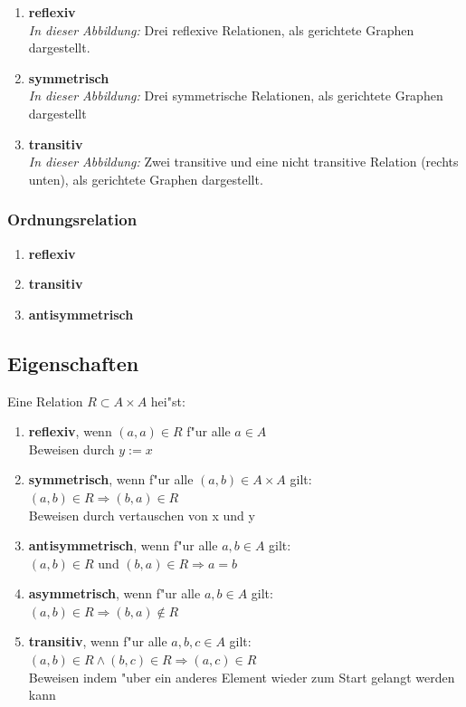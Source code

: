 \documentclass[10pt,a4paper,landscape]{article}
\begin{document}
\begin{multicols*}{3}
		\begin{enumerate}
			\item \textbf{reflexiv} \\\textit{In dieser Abbildung:} Drei reflexive Relationen, als gerichtete Graphen dargestellt.
			
			\item \textbf{symmetrisch} \\\textit{In dieser Abbildung:} Drei symmetrische Relationen, als gerichtete Graphen dargestellt
			
			\item \textbf{transitiv} \\\textit{In dieser Abbildung:} Zwei transitive und eine nicht transitive Relation (rechts unten), als gerichtete Graphen dargestellt.
			
		\end{enumerate}
		
		\subsubsection{Ordnungsrelation}
		\begin{enumerate}
			\item \textbf{reflexiv}
			\item \textbf{transitiv}
			\item \textbf{antisymmetrisch}
		\end{enumerate}
		
		\subsection{Eigenschaften}
		Eine Relation $R \subset A \times A$ hei"st:
		\begin{enumerate}
			\item \textbf{reflexiv}, wenn $(a,a) \in R$ f"ur alle $a \in A$\\Beweisen durch $y := x$
			\item \textbf{symmetrisch}, wenn f"ur alle $(a, b) \in A  \times A$ gilt:\\ $(a,b) \in R \Rightarrow (b,a) \in R$\\Beweisen durch vertauschen von x und y
			\item \textbf{antisymmetrisch}, wenn f"ur alle $a, b \in A$ gilt: \\ $(a, b) \in R$ und $(b, a) \in R \Rightarrow a =b$
			\item \textbf{asymmetrisch},  wenn f"ur alle $a, b \in A$ gilt: \\ $(a, b) \in R \Rightarrow (b, a) \notin R$
			\item \textbf{transitiv},  wenn f"ur alle $a, b, c \in A$ gilt: \\ $(a, b) \in R \land (b,c) \in R \Rightarrow (a, c) \in R$\\Beweisen indem "uber ein anderes Element wieder zum Start gelangt werden kann
		\end{enumerate}
	

\end{multicols*}
\end{document}
